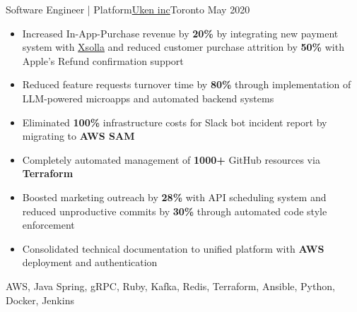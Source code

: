 %
%
%
\begin{experiences}
  \experienceCurrent
    {Software Engineer | Platform}{\href{https://uken.com}{Uken inc}}{Toronto}
    {May 2020} {
                    \begin{itemize}
                        \setlength\itemsep{0.6em}

                        \item Increased In-App-Purchase revenue by \textbf{20\%} by integrating new payment system with \href{https://xsolla.com}{Xsolla} and reduced customer purchase attrition by \textbf{50\%} with Apple's Refund confirmation support

                        \item Reduced feature requests turnover time by \textbf{80\%} through implementation of LLM-powered microapps and automated backend systems

                        \item Eliminated \textbf{100\%} infrastructure costs for Slack bot incident report by migrating to \textbf{AWS SAM}

                        \item Completely automated management of \textbf{1000+} GitHub resources via \textbf{Terraform}

                        \item Boosted marketing outreach by \textbf{28\%} with API scheduling system and reduced unproductive commits by \textbf{30\%} through automated code style enforcement

                        \item Consolidated technical documentation to unified  platform with \textbf{AWS} deployment and  authentication
                    \end{itemize}
                    }
                    {AWS, Java Spring, gRPC, Ruby, Kafka, Redis, Terraform, Ansible, Python, Docker, Jenkins}
\end{experiences}
